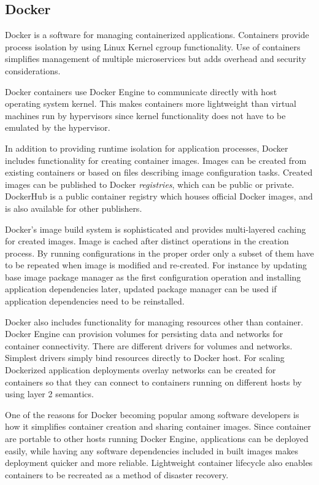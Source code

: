 \documentclass[officiallayout]{tktla}
\begin{document}
\subsection{Docker}

Docker \cite{docker} is a software for managing containerized applications.
Containers provide process isolation by using Linux Kernel cgroup \cite{cgroup}
functionality. Use of containers simplifies management of multiple
microservices but adds overhead and security considerations.

Docker containers use Docker Engine to communicate directly with host operating
system kernel. This makes containers more lightweight than virtual machines run
by hypervisors since kernel functionality does not have to be emulated by the
hypervisor.

In addition to providing runtime isolation for application processes, Docker
includes functionality for creating container images. Images can be created
from existing containers or based on files describing image configuration
tasks. Created images can be published to Docker \textit{registries}, which can
be public or private. DockerHub is a public container registry which houses
official Docker images, and is also available for other publishers.

Docker's image build system is sophisticated and provides multi-layered caching
for created images. Image is cached after distinct operations in the creation
process. By running configurations in the proper order only a subset of them
have to be repeated when image is modified and re-created. For instance by
updating base image package manager as the first configuration operation and
installing application dependencies later, updated package manager can be used
if application dependencies need to be reinstalled.

Docker also includes functionality for managing resources other than container.
Docker Engine can provision volumes for persisting data and networks for
container connectivity. There are different drivers for volumes and networks.
Simplest drivers simply bind resources directly to Docker host. For scaling
Dockerized application deployments overlay networks can be created for
containers so that they can connect to containers running on different hosts by
using layer 2 semantics.

One of the reasons for Docker becoming popular among software developers is how
it simplifies container creation and sharing container images. Since container
are portable to other hosts running Docker Engine, applications can be deployed
easily, while having any software dependencies included in built images makes
deployment quicker and more reliable. Lightweight container lifecycle also
enables containers to be recreated as a method of disaster recovery.
\end{document}
